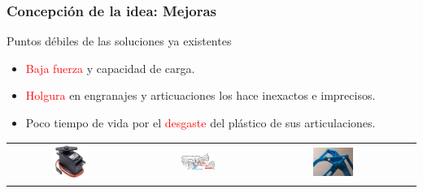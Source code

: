 \documentclass{beamer}
\begin{document}
\begin{frame}
  \frametitle{Concepción de la idea: Mejoras}
  \begin{block}{Puntos débiles de las soluciones ya existentes}
    \begin{itemize}
    \item \textcolor{red}{Baja fuerza} y capacidad de carga.
    \item \textcolor{red}{Holgura} en engranajes y articuaciones los hace inexactos e imprecisos.
    \item Poco tiempo de vida por el \textcolor{red}{desgaste} del plástico de sus articulaciones.
    \end{itemize}
  \end{block}

  \begin{table}[htbp]
    \centering
    \begin{tabular}{cccc}
        \includegraphics[width=0.3\textwidth, valign=m]{figs/servo.jpg} & \includegraphics[width=0.3\textwidth, valign=m]{figs/holgura.png} 
        & \includegraphics[width=0.3\textwidth, valign=m]{figs/friccion.jpg}
        
    \end{tabular}
  \end{table} 

\end{frame}
\end{document}

